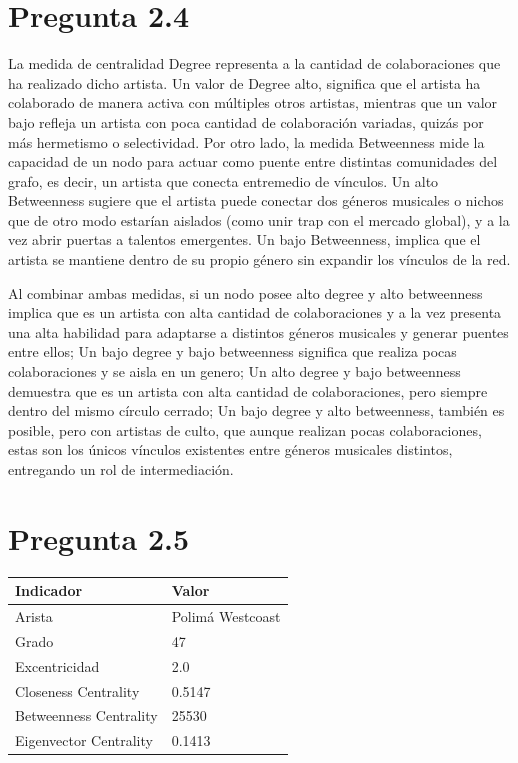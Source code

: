 \documentclass[
	spanish, %
	letterpaper, oneside
]{article}
\begin{document}
\section{Pregunta 2.4}
La medida de centralidad Degree representa a la cantidad de colaboraciones que ha realizado dicho artista. Un valor de Degree alto, significa que el artista ha colaborado de manera activa con múltiples otros artistas, mientras que un valor bajo refleja un artista con poca cantidad de colaboración variadas, quizás por más hermetismo o selectividad. Por otro lado, la medida Betweenness mide la capacidad de un nodo para actuar como puente entre distintas comunidades del grafo, es decir, un artista que conecta entremedio de vínculos. Un alto Betweenness sugiere que el artista puede conectar dos géneros musicales o nichos que de otro modo estarían aislados (como unir trap con el mercado global), y a la vez abrir puertas a talentos emergentes. Un bajo Betweenness, implica que el artista se mantiene dentro de su propio género sin expandir los vínculos de la red.

Al combinar ambas medidas, si un nodo posee alto degree y alto betweenness implica que es un artista con alta cantidad de colaboraciones y a la vez presenta una alta habilidad para adaptarse a distintos géneros musicales y generar puentes entre ellos; Un bajo degree y bajo betweenness significa que realiza pocas colaboraciones y se aisla en un genero; Un alto degree y bajo betweenness demuestra que es un artista con alta cantidad de colaboraciones, pero siempre dentro del mismo círculo cerrado; Un bajo degree y alto betweenness, también es posible, pero con artistas de culto, que aunque realizan pocas colaboraciones, estas son los únicos vínculos existentes entre géneros musicales distintos, entregando un rol de intermediación.



\section{Pregunta 2.5}

\begin{tabular}{|l|l|}
\hline
Indicador & Valor \\
\hline
Arista & Polimá Westcoast \\
Grado & 47 \\
Excentricidad & 2.0 \\
Closeness Centrality & 0.5147 \\
Betweenness Centrality & 25530 \\
Eigenvector Centrality & 0.1413 \\
\hline
\end{tabular}
\end{document}
